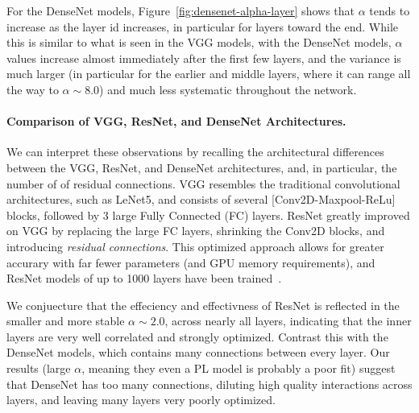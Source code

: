 For the DenseNet models, Figure~\ref{fig:densenet-alpha-layer} shows that $\alpha$ tends to increase as the layer id increases, in particular for layers toward the end.
While this is similar to what is seen in the VGG models, with the DenseNet models, $\alpha$ values increase almost immediately after the first few layers, and the variance is much larger (in particular for the earlier and middle layers, where it can range all the way to $\alpha\sim 8.0$) and much less systematic throughout the network.



\paragraph{Comparison of VGG, ResNet, and DenseNet Architectures.}
We can interpret these observations by recalling the architectural differences between the VGG, ResNet, and DenseNet architectures,
and, in particular, the number of of residual connections. VGG resembles the  traditional convolutional architectures,
such as LeNet5, and consists of several [Conv2D-Maxpool-ReLu] blocks, followed by 3 large Fully Connected (FC) layers.
ResNet greatly improved on VGG by replacing the large FC layers, shrinking the Conv2D blocks, and introducing \emph{residual connections}.
This optimized approach allows for greater accurary with far fewer parameters (and GPU memory requirements), and
ResNet models of up to 1000 layers have been trained~\cite{resnet1000}.

We conjuecture that the effeciency and effectivness of ResNet is reflected in the smaller and more stable $\alpha\sim 2.0$, across nearly all layers, indicating that the inner layers are very well correlated and strongly optimized.
Contrast this with the DenseNet models, which contains many connections between every layer.
Our results (large $\alpha$, meaning they even a PL model is probably a poor fit) suggest that DenseNet has too many connections, diluting high quality interactions across layers, and leaving many layers very poorly optimized.


